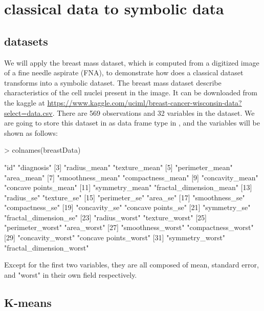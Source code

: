 \documentclass[article]{jss}
\begin{document}
\section{classical data to symbolic data}

\subsection{datasets}

We will apply the breast mass dataset, which is computed from a digitized image of a fine needle aspirate (FNA), to demonstrate how does a classical dataset transforms into a symbolic dataset. The breast mass dataset describe characteristics of the cell nuclei present in the image. It can be downloaded from the kaggle at \url{https://www.kaggle.com/uciml/breast-cancer-wisconsin-data?select=data.csv}. There are 569 observations and 32 variables in the dataset. We are going to store this dataset in  as data frame type in , and the variables will be shown as follows:
\begin{Schunk}
\begin{Sinput}
> colnames(breastData)
\end{Sinput}
\begin{Soutput}
 [1] "id"                      "diagnosis"              
 [3] "radius_mean"             "texture_mean"           
 [5] "perimeter_mean"          "area_mean"              
 [7] "smoothness_mean"         "compactness_mean"       
 [9] "concavity_mean"          "concave points_mean"    
[11] "symmetry_mean"           "fractal_dimension_mean" 
[13] "radius_se"               "texture_se"             
[15] "perimeter_se"            "area_se"                
[17] "smoothness_se"           "compactness_se"         
[19] "concavity_se"            "concave points_se"      
[21] "symmetry_se"             "fractal_dimension_se"   
[23] "radius_worst"            "texture_worst"          
[25] "perimeter_worst"         "area_worst"             
[27] "smoothness_worst"        "compactness_worst"      
[29] "concavity_worst"         "concave points_worst"   
[31] "symmetry_worst"          "fractal_dimension_worst"
\end{Soutput}
\end{Schunk}

Except for the first two variables, they are all composed of mean, standard error, and "worst" in their own field respectively.

\subsection{K-means}
\end{document}
